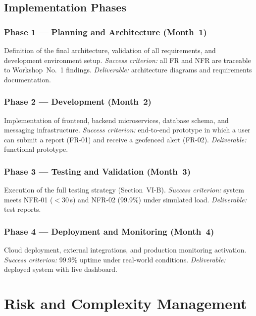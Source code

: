 \documentclass[10pt,twocolumn]{article}
\begin{document}
\subsection{Implementation Phases}

\subsubsection{Phase 1 --- Planning and Architecture (Month~1)}
Definition of the final architecture, validation of all requirements,
and development environment setup. \textit{Success criterion:} all FR
and NFR are traceable to Workshop~No.~1 findings. \textit{Deliverable:}
architecture diagrams and requirements documentation.

\subsubsection{Phase 2 --- Development (Month~2)}
Implementation of frontend, backend microservices, database schema, and
messaging infrastructure. \textit{Success criterion:} end-to-end
prototype in which a user can submit a report (FR-01) and receive a
geofenced alert (FR-02). \textit{Deliverable:} functional prototype.

\subsubsection{Phase 3 --- Testing and Validation (Month~3)}
Execution of the full testing strategy (Section~VI-B). \textit{Success
criterion:} system meets NFR-01 ($<$30\,s) and NFR-02 (99.9\%) under
simulated load. \textit{Deliverable:} test reports.

\subsubsection{Phase 4 --- Deployment and Monitoring (Month~4)}
Cloud deployment, external integrations, and production monitoring
activation. \textit{Success criterion:} 99.9\% uptime under real-world
conditions. \textit{Deliverable:} deployed system with live dashboard.

\section{Risk and Complexity Management}
\end{document}

